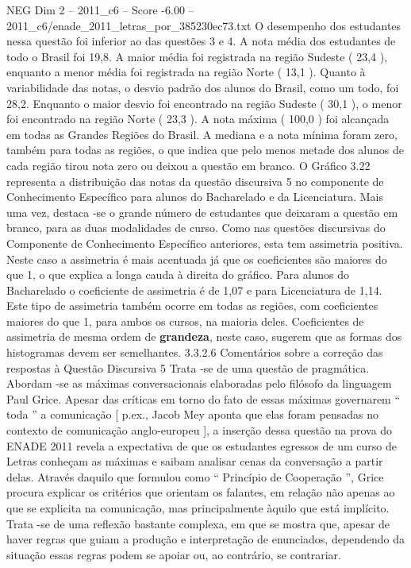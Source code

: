 \begin{textsample}{NEG Dim 2 – 2011\_c6 – Score -6.00 – 2011\_c6/enade\_2011\_letras\_por\_385230ec73.txt}
O desempenho dos estudantes nessa questão foi inferior ao das questões 3 e 4.
A nota média dos estudantes de todo o Brasil foi 19,8.
A maior média foi registrada na região Sudeste ( 23,4 ), enquanto a menor média foi registrada na região Norte ( 13,1 ).
Quanto à variabilidade das notas, o desvio padrão dos alunos do Brasil, como um todo, foi 28,2.
Enquanto o maior desvio foi encontrado na região Sudeste ( 30,1 ), o menor foi encontrado na região Norte ( 23,3 ).
A nota máxima ( 100,0 ) foi alcançada em todas as Grandes Regiões do Brasil.
A mediana e a nota mínima foram zero, também para todas as regiões, o que indica que pelo menos metade dos alunos de cada região tirou nota zero ou deixou a questão em branco.
O Gráfico 3.22 representa a distribuição das notas da questão discursiva 5 no componente de Conhecimento Específico para alunos do Bacharelado e da Licenciatura.
Mais uma vez, destaca -se o grande número de estudantes que deixaram a questão em branco, para as duas modalidades de curso.
Como nas questões discursivas do Componente de Conhecimento Específico anteriores, esta tem assimetria positiva.
Neste caso a assimetria é mais acentuada já que os coeficientes são maiores do que 1, o que explica a longa cauda à direita do gráfico.
Para alunos do Bacharelado o coeficiente de assimetria é de 1,07 e para Licenciatura de 1,14.
Este tipo de assimetria também ocorre em todas as regiões, com coeficientes maiores do que 1, para ambos os cursos, na maioria deles.
Coeficientes de assimetria de mesma ordem de \textbf{grandeza}, neste caso, sugerem que as formas dos histogramas devem ser semelhantes. 3.3.2.6 Comentários sobre a correção das respostas à Questão Discursiva 5 Trata -se de uma questão de pragmática.
Abordam -se as máximas conversacionais elaboradas pelo filósofo da linguagem Paul Grice.
Apesar das críticas em torno do fato de essas máximas governarem “ toda ” a comunicação [ p.ex., Jacob Mey aponta que elas foram pensadas no contexto de comunicação anglo-europeu ], a inserção dessa questão na prova do ENADE 2011 revela a expectativa de que os estudantes egressos de um curso de Letras conheçam as máximas e saibam analisar cenas da conversação a partir delas.
Através daquilo que formulou como “ Princípio de Cooperação ”, Grice procura explicar os critérios que orientam os falantes, em relação não apenas ao que se explicita na comunicação, mas principalmente àquilo que está implícito.
Trata -se de uma reflexão bastante complexa, em que se mostra que, apesar de haver regras que guiam a produção e interpretação de enunciados, dependendo da situação essas regras podem se apoiar ou, ao contrário, se contrariar.

\end{textsample}
